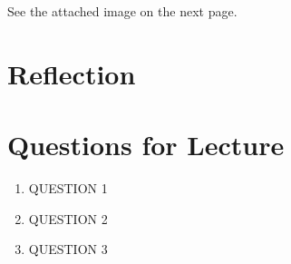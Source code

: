 \documentclass[12pt]{article}
\begin{document}
See the attached image on the next page.

% 

\section{Reflection}

\section{Questions for Lecture}

\begin{enumerate}
    \item QUESTION 1
    \item QUESTION 2
    \item QUESTION 3
\end{enumerate}



\end{document}
